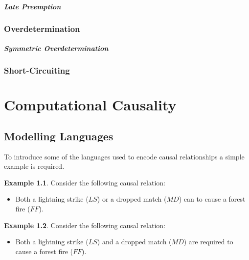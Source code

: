 \documentclass[11pt,a4paper]{book}
\theoremstyle{definition}
\theoremstyle{definition}
\newtheorem{example}{Example}[section]
\theoremstyle{definition}
\theoremstyle{remark}
\begin{document}
\paragraph*{Late Preemption}

\subsection{Overdetermination}

\paragraph*{Symmetric Overdetermination}

\subsection{Short-Circuiting}



\chapter{Computational Causality}

\section{Modelling Languages}

To introduce some of the languages used to encode causal relationships a simple example is required. 
\begin{example}
\label{ex:causal_model_forrest_fire_1}
Consider the following causal relation:
\begin{itemize}
\item Both a lightning strike ($\mathit{LS}$) or a dropped match ($\mathit{MD}$) can to cause a forest fire ($\mathit{FF}$).
\end{itemize}
\end{example}

\begin{example}
\label{ex:causal_model_forrest_fire_2}
Consider the following causal relation:
\begin{itemize}
\item Both a lightning strike ($\mathit{LS}$) and a dropped match ($\mathit{MD}$) are required to cause a forest fire ($\mathit{FF}$).
\end{itemize}
\end{example}
\end{document}
